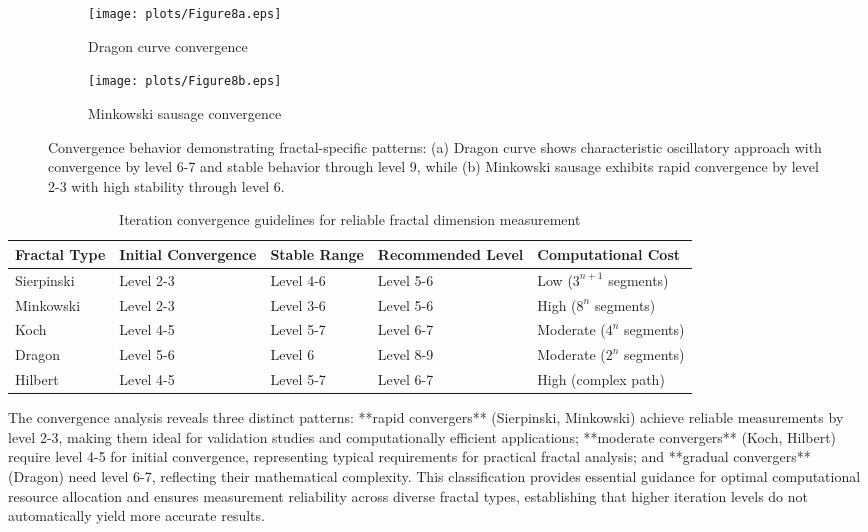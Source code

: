 \documentclass[preprint,12pt]{elsarticle}
\def\textbf#1{#1}%
\begin{document}
\begin{figure}[tbp]
\centering
\begin{subfigure}[b]{0.8\textwidth}
    \centering
    \texttt{[image: plots/Figure8a.eps]}
    \caption{Dragon curve convergence}
    \label{fig:dragon_convergence}
\end{subfigure}

\vspace{0.5cm}

\begin{subfigure}[b]{0.8\textwidth}
    \centering
    \texttt{[image: plots/Figure8b.eps]}
    \caption{Minkowski sausage convergence}
    \label{fig:minkowski_convergence}
\end{subfigure}
\caption{Convergence behavior demonstrating fractal-specific patterns: (a) Dragon curve shows characteristic oscillatory approach with convergence by level 6-7 and stable behavior through level 9, while (b) Minkowski sausage exhibits rapid convergence by level 2-3 with high stability through level 6.}
\label{fig:convergence_examples}
\end{figure}

\begin{table}[H]
\centering
\small
\begin{tabularx}{\textwidth}{@{}lXXXX@{}}
\toprule
\textbf{Fractal Type} & \textbf{Initial Convergence} & \textbf{Stable Range} & \textbf{Recommended Level} & \textbf{Computational Cost} \\
\midrule
Sierpinski & Level 2-3 & Level 4-6 & Level 5-6 & Low ($3^{n+1}$ segments) \\
Minkowski & Level 2-3 & Level 3-6 & Level 5-6 & High ($8^n$ segments) \\
Koch & Level 4-5 & Level 5-7 & Level 6-7 & Moderate ($4^n$ segments) \\
Dragon & Level 5-6 & Level 6 & Level 8-9 & Moderate ($2^n$ segments) \\
Hilbert & Level 4-5 & Level 5-7 & Level 6-7 & High (complex path) \\
\bottomrule
\end{tabularx}
\caption{Iteration convergence guidelines for reliable fractal dimension measurement}
\label{tab:convergence_guidelines}
\end{table}

The convergence analysis reveals three distinct patterns: **rapid convergers** (Sierpinski, Minkowski) achieve reliable measurements by level 2-3, making them ideal for validation studies and computationally efficient applications; **moderate convergers** (Koch, Hilbert) require level 4-5 for initial convergence, representing typical requirements for practical fractal analysis; and **gradual convergers** (Dragon) need level 6-7, reflecting their mathematical complexity. This classification provides essential guidance for optimal computational resource allocation and ensures measurement reliability across diverse fractal types, establishing that higher iteration levels do not automatically yield more accurate results.
\end{document}
